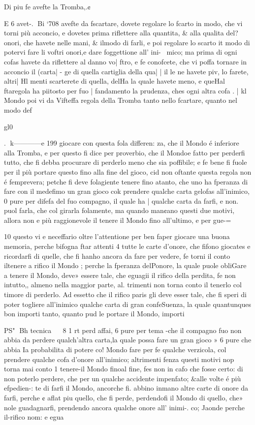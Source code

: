 \documentclass[12pt,a6paper]{article}
\begin{document}
Di piu fe avefte la Tromba,.¢

E 6 avet-.
Bi ‘708
avefte da fscartare, dovete regolare lo fcarto in modo, che vi
torni più acconcio, e dovetes
prima riflettere alla quantita, &
alla qualita del?onori, che havete nelle mani, & ilmodo di
farli, e poi regolare lo scarto it
modo di potervi fare li voftri
onori,e dare foggettione all’ ini-~
mico; ma prima di ogni cofas
havete da riflettere al danno vo| ftro, e fe conofcete, che vi poffa tornare in acconcio il (carta| - ge di quella cartiglia della qua| | il le ne havete piv, lo farete, altri| Hl menti scarterete di quella, delHa la quale havete meno, e queHal ftaregola ha piitosto per fuo
| fandamento la prudenza, ches
ogni altra cofa .
| kl Mondo poi vi da Vifteffa regola della Tromba tanto nello
fcartare, quanto nel modo def

gl0~

.
k————e
199
giocare con questa fola differen:
za, che il Mondo é inferiore alla Tromba, e per questo fi dice
per proverbio, che il Mondoe
fatto per perderfi tutto, che fi
debba procurare di perderlo
meno che sia poffibile; e fe bene
fi fuole per il più portare questo
fino alla fine del gioco, cid non
oftante questa regola non é femprevera; petche fi deve folagiente tenere fino atanto, che
uno ha fperanza di fare con il
medefimo un gran gioco cok
prendere qualche carta gelofas
all’inimico, 0 pure per difefa
del fuo compagno, il quale ha
| qualche carta da farfi, e non.
puol farla, che col girarla folamente, ma quando man¢ano
questi due motivi, allora non e
più raggionevole il tenere il
Mondo fino all’ultimo, e per
gue-=

 
 

10
questo vi e neceffario oltre l’attentione per ben faper giocare
una buona memoria, perche bifogna ftar attenti 4 tutte le carte d’onore, che fifono giocates
e ricordarfi di quelle, che fi hanho ancora da fare per vedere,
fe torni il conto iltenere a rifico il Mondo ; perche la fperanza
delPonore, la quale puole obliGare a tenere il Mondo, deve»
essere tale, che eguagii il rifico
della perdita, fe non intutto,,
almeno nella maggior parte, al.
trimenti non torna conto il tenerlo col timore di perderlo.
Ad essetto che il rifico paris
gli deve esser tale, che fi speri
di poter togliere all’inimico
qualche carta di gran confeSuenza, la quale quantunques
bon importi tanto, quanto pud
le portare il Mondo, importi

PS"
Bh tecnica
~~ 8 1 rt
perd affai, 6 pure per tema
-che il compagno fuo non abbia
da perdere qualch’altra carta,la
quale possa fare un gran gioco »
6 pure che abbia Ia probabilita
di potere co! Mondo fare per fe
qualche verzicola, col prendere
qualche cofa d’onore all’inimico; altrimenti fenza questi motivi nop torna mai conto 1 tenere-il Mondo finoal fine, fes
non in cafo che fosse certo: di
non poterlo perdere, che per
un qualche accidente impenfato; &alle volte é più efpedien-:
te di farfi il Mondo, ancorche fi.
abbino inmano altre carte di
onore da farfi, perche ¢ aflat
piu quello, che fi perde, perdendofi il Mondo di quello, che»
nole guadagnarfi, prendendo
ancora qualche onore all’ inimi-.
co; Jaonde perche il-rifico nom:
e egua 
\end{document}
